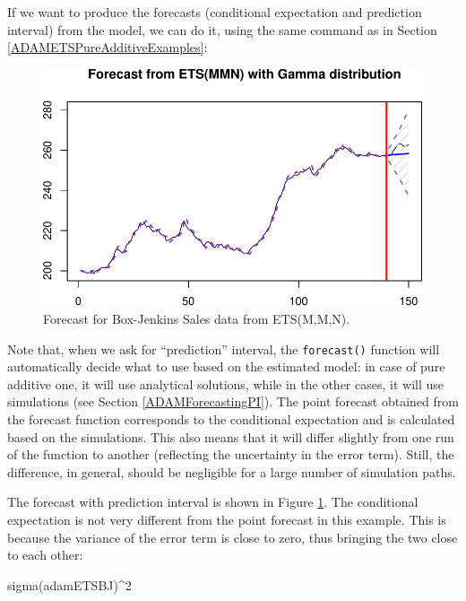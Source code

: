 \documentclass[
]{book}
\newenvironment{Shaded}{\begin{snugshade}}{\end{snugshade}}
\newcommand{\DecValTok}[1]{\textcolor[rgb]{0.00,0.00,0.81}{#1}}
\newcommand{\FunctionTok}[1]{\textcolor[rgb]{0.00,0.00,0.00}{#1}}
\newcommand{\NormalTok}[1]{#1}
\newcommand{\SpecialCharTok}[1]{\textcolor[rgb]{0.00,0.00,0.00}{#1}}
\theoremstyle{definition}
\theoremstyle{definition}
\theoremstyle{definition}
\theoremstyle{definition}
\theoremstyle{remark}
\begin{document}
If we want to produce the forecasts (conditional expectation and prediction interval) from the model, we can do it, using the same command as in Section \ref{ADAMETSPureAdditiveExamples}:

\begin{figure}
\centering
\includegraphics{Svetunkov--2022----ADAM_files/figure-latex/BJSalesadamETSMMNForecast-1.pdf}
\caption{\label{fig:BJSalesadamETSMMNForecast}Forecast for Box-Jenkins Sales data from ETS(M,M,N).}
\end{figure}

Note that, when we ask for ``prediction'' interval, the \texttt{forecast()} function will automatically decide what to use based on the estimated model: in case of pure additive one, it will use analytical solutions, while in the other cases, it will use simulations (see Section \ref{ADAMForecastingPI}). The point forecast obtained from the forecast function corresponds to the conditional expectation and is calculated based on the simulations. This also means that it will differ slightly from one run of the function to another (reflecting the uncertainty in the error term). Still, the difference, in general, should be negligible for a large number of simulation paths.

The forecast with prediction interval is shown in Figure \ref{fig:BJSalesadamETSMMNForecast}. The conditional expectation is not very different from the point forecast in this example. This is because the variance of the error term is close to zero, thus bringing the two close to each other:

\begin{Shaded}
\begin{Highlighting}[]
\FunctionTok{sigma}\NormalTok{(adamETSBJ)}\SpecialCharTok{\^{}}\DecValTok{2}
\end{Highlighting}
\end{Shaded}
\end{document}
